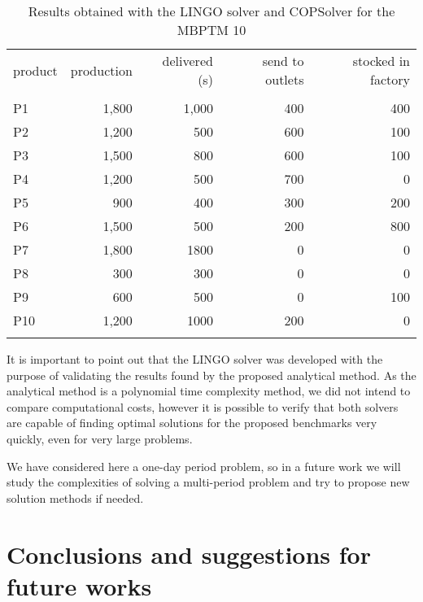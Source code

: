 \documentclass[authoryear,manuscript,12pt]{elsarticle}
\begin{document}
\begin{table}[h]
\begin{center}
\begin{footnotesize}
\begin{tabular}[c]{l r r r r}
product & production & delivered (s) & send to outlets & stocked in factory \\
\cline {1-5} \\
P1 & 1,800 & 1,000 & 400 & 400 \\
P2 & 1,200 & 500 & 600 & 100 \\
P3 & 1,500 & 800 & 600 & 100 \\
P4 & 1,200 & 500 & 700 & 0 \\
P5 & 900 & 400 & 300 & 200 \\
P6 & 1,500 & 500 & 200 & 800 \\
P7 & 1,800 & 1800 & 0 & 0 \\
P8 & 300 & 300 & 0 & 0 \\
P9 & 600 & 500 & 0 & 100 \\
P10 & 1,200 & 1000 & 200 & 0 \\
\cline {1-5} \\
\end{tabular}
\caption{Results obtained with the LINGO solver and COPSolver for the MBPTM 10}
\label{tab:compResultsMBPTMP3}
\end{footnotesize}
\end{center}
\end{table}

It is important to point out that the LINGO solver was developed with the purpose of validating the results found by the proposed analytical method. As the analytical method is a polynomial time complexity method, we did not intend to compare computational costs, however it is possible to verify that both solvers are capable of finding optimal solutions for the proposed benchmarks very quickly, even for very large problems.

We have considered here a one-day period problem, so in a future work we will study the complexities of solving a multi-period problem and try to propose new solution methods if needed. 

\section{Conclusions and suggestions for future works}
\label{sec:conclusions}
\end{document}
